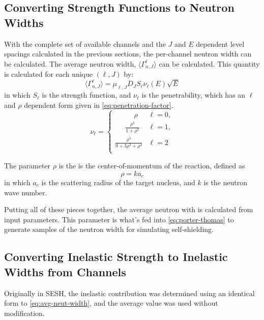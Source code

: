     \subsection{Converting Strength Functions to Neutron Widths}
        With the complete set of available channels and the $J$ and $E$ dependent level spacings calculated in the previous sections, the per-channel neutron width can be calculated. The average neutron width, $\langle \Gamma_{n,J}^{\ell} \rangle$ can be calculated. This quantity is calculated for each unique $(\ell,J)$ by:
        \begin{equation}
            \label{eq:avg-neut-width}
            \langle \Gamma_{n,J}^{\ell} \rangle = \mu_{\ell,J} D_J S_\ell \nu_{\ell}(E) \sqrt{E}
        \end{equation}
        in which $S_\ell$ is the strength function, and $\nu_{\ell}$ is the penetrability, which has an $\ell$ and $\rho$ dependent form given in \autoref{eq:penetration-factor}.
        \begin{equation}
        \label{eq:penetration-factor}
            \nu_\ell = \begin{cases}
                \quad\quad\:\:\:\displaystyle\rho & \ell=0,\\[12pt]
                \quad\:\:\displaystyle\frac{\rho^3}{1 + \rho^2} & \ell=1,\\[12pt]
                \displaystyle\frac{\rho^5}{9 + 3\rho^2 + \rho^4} & \ell=2\\
            \end{cases}
        \end{equation}

        The parameter $\rho$ is the is the center-of-momentum of the reaction, defined as
        \begin{equation}
            \rho = k a_c
            \label{eq:center-of-momentum}
        \end{equation}
        in which $a_c$ is the scattering radius of the target nucleus, and $k$ is the neutron wave number.

        Putting all of these pieces together, the average neutron with is calculated from input parameters. This parameter is what's fed into \autoref{eq:porter-thomas} to generate samples of the neutron width for simulating self-shielding.
        
    \subsection{Converting Inelastic Strength to Inelastic Widths from Channels}
        \label{ssec:inelastic-strength}
        Originally in SESH, the inelastic contribution was determined using an identical form to \autoref{eq:avg-neut-width}, and the average value was used without modification.

